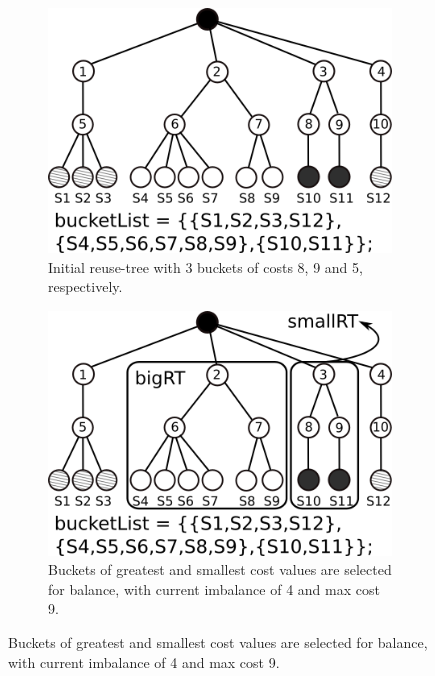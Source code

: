 \begin{figure}[t!]
	 \centering
	 \begin{subfigure}[t]{0.3\textwidth}
			 \centering
			 \includegraphics[width=\textwidth]{img/balance1}
			 \caption{Initial reuse-tree with 3 buckets of costs 8, 9 and 5, respectively.}
			 \label{fig:balance1}
	 \end{subfigure}
	 \hspace{1mm}
	 \begin{subfigure}[t]{0.3\textwidth}
			 \centering
			 \includegraphics[width=\textwidth]{img/balance2}
			 \caption{Buckets of greatest and smallest cost values are selected for balance, with current imbalance of 4 and max cost 9.}
			 \label{fig:balance2}
	 \end{subfigure}
	 \hspace{1mm}

\end{figure}
